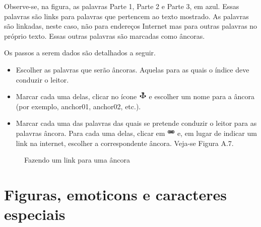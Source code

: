 Observe-se, na figura, as palavras Parte 1, Parte 2 e Parte 3, em azul. Essas palavras são links para palavras que pertencem ao texto mostrado. As palavras são linkadas, neste caso, não para endereços Internet mas para outras palavras no próprio texto. Essas outras palavras são marcadas como âncoras.

Os passos a serem dados são detalhados a seguir.

\begin{itemize}
 \item Escolher as palavras que serão âncoras. Aquelas para as quais o índice deve conduzir o leitor.
 \item Marcar cada uma delas, clicar no ícone \includegraphics[width=0.4cm]{imagem/cap0/anchor.jpg} e escolher um nome para a âncora (por exemplo, anchor01, anchor02, etc.).
 \item Marcar cada uma das palavras das quais se pretende conduzir o leitor para as palavras âncora. Para cada uma delas, clicar em \includegraphics[width=0.4cm]{imagem/cap0/link.jpg} e, em lugar de indicar um link na internet, escolher a correspondente âncora. Veja-se Figura A.7.
\end{itemize}

\begin{figure}
 \begin{center}
  \caption{Fazendo um link para uma âncora}
 \end{center}
\end{figure}


\section{Figuras, emoticons e caracteres especiais}

